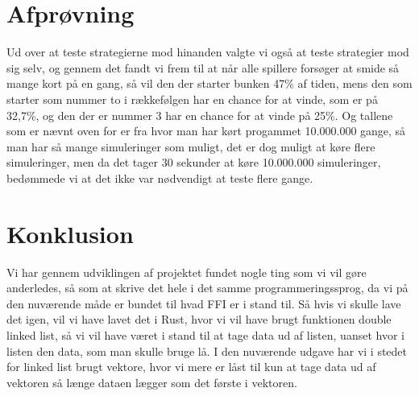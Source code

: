 \documentclass[a4paper, 12pt]{article}
\begin{document}
\section{Afprøvning}
Ud over at teste strategierne mod hinanden valgte vi også at teste strategier mod sig selv, og gennem det fandt vi frem til at når alle spillere forsøger at smide så mange kort på en gang, så vil den der starter bunken 47\% af tiden, mens den som starter som nummer to i rækkefølgen har en chance for at vinde, som er på 32,7\%, og den der er nummer 3 har en chance for at vinde på 25\%. 
Og tallene som er nævnt oven for er fra hvor man har kørt progammet 10.000.000 gange, så man har så mange simuleringer som muligt, det er dog muligt at køre flere simuleringer, men da det tager 30 sekunder at køre 10.000.000 simuleringer, bedømmede vi at det ikke var nødvendigt at teste flere gange.

\section{Konklusion}
Vi har gennem udviklingen af projektet fundet nogle ting som vi vil gøre anderledes, så som at skrive det hele i det samme programmeringssprog, da vi på den nuværende måde er bundet til hvad FFI er i stand til. Så hvis vi skulle lave det igen, vil vi have lavet det i Rust, hvor vi vil have brugt funktionen double linked list, så vi vil have været i stand til at tage data ud af listen, uanset hvor i listen den data, som man skulle bruge lå. I den nuværende udgave har vi i stedet for linked list brugt vektore, hvor vi mere er låst til kun at tage data ud af vektoren så længe dataen lægger som det første i vektoren.

\bigbreak



\vfill
\pagebreak
\end{document}
